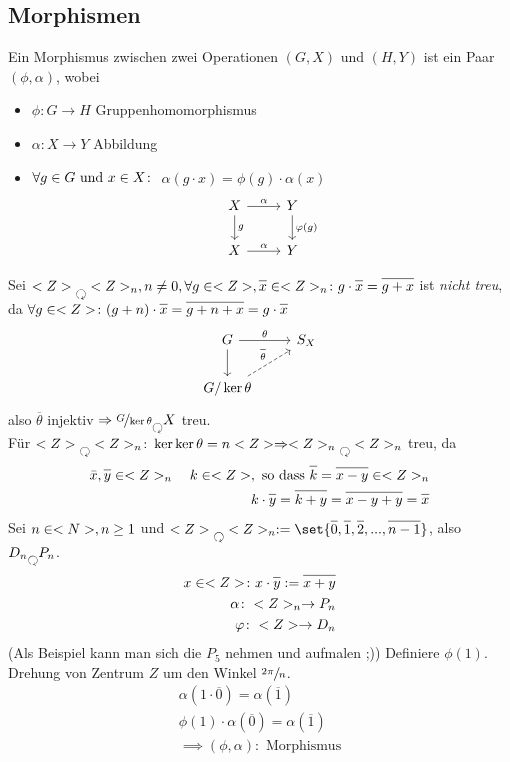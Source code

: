 \subsection*{Morphismen}
\begin{definition}
	Ein Morphismus zwischen zwei Operationen $(G,X)$ und $(H,Y)$ ist ein Paar $(\phi, \alpha)$, wobei
	\begin{itemize}
		\item $\phi\colon G \to H$ Gruppenhomomorphismus
		\item $\alpha\colon X \to Y$ Abbildung
		\item $\forall g \in G \text{ und } x \in X\colon$ $\alpha(g \cdot x) = \phi(g)\cdot \alpha(x)$
		\[
			\begin{tikzcd}
			X \arrow[r, "\alpha"] \arrow[d, "g"] & Y \arrow[d, "\phi(g)"] \\
			X \arrow[r, "\alpha"]                & Y                     
			\end{tikzcd}
		\] 
	\end{itemize}
\end{definition}
\begin{*example}
	Sei $\Z \Circlearrowleft \Z_n, n \neq 0, \forall g \in \Z, \overline{x} \in \Z_n\colon g \cdot \overline{x} = \overline{g+x}$ ist \emph{nicht treu}, da $\forall g \in \Z \colon (g+n)\cdot \overline{x} = \overline{g+n+x} = g \cdot \overline{x}$
	\[
		\begin{tikzcd}
		G \arrow[r, "\theta"] \arrow[d]                       & S_X \\
		G/\ker \theta \arrow[ru, "\overline{\theta}", dashed] &    
		\end{tikzcd}
	\]
	also $\overline{\theta}$ injektiv $\implies \lnkset{G}{\ker \theta} \Circlearrowleft X$ treu.\\
	Für $\Z \Circlearrowleft \Z_n \colon \ker \ker \theta = n\Z \implies \Z_n \Circlearrowleft \Z_n$ treu, da
	\begin{align*}
		\overline{x}, \overline{y} \in \Z_n\quad k\in \Z, \text{ so dass } \overline{k} = \overline{x-y} \in \Z_n\\
		k \cdot \overline{y} = \overline{k+y} = \overline{x-y+y} = \overline{x}
	\end{align*}
	Sei $n \in <N>, n \ge 1$ und $\Z \Circlearrowleft \Z_n := \set{\overline{0}, \overline{1}, \overline{2}, ..., \overline{n-1}}$, also $D_n \Circlearrowleft P_n$.
	\begin{align*}
		x \in \Z \colon x \cdot \overline{y} := \overline{x+y}\\
		\alpha\colon \Z_n \to P_n\\
		\phi\colon \Z \to D_n
	\end{align*}
	(Als Beispiel kann man sich die $P_5$ nehmen und aufmalen ;))
	Definiere $\phi(1)$. Drehung von Zentrum $Z$ um den Winkel $\sfrac{2\pi}{n}$.
	\begin{align*}
		\alpha(1 \cdot \overline{0}) = \alpha(\overline{1})\\
		\phi(1)\cdot \alpha(\overline{0}) = \alpha(\overline{1})\\
		\implies (\phi,\alpha)\colon \text{ Morphismus}
	\end{align*}
\end{*example}
